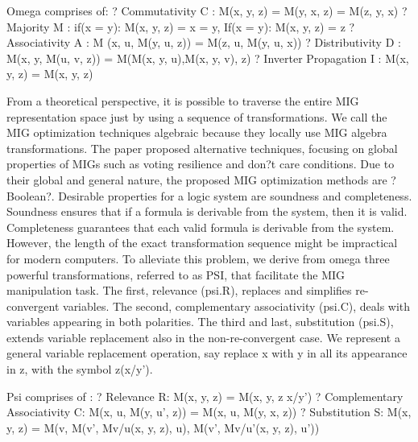 \documentclass[
	accentcolor=1c,%
	type=intern,
	marginpar=false,
	ruledheaders=section,
	class=report,
	BCOR=5mm,
      parskip=half-,
	fontsize=10pt
	]{tudapub}
\begin{document}
		Omega comprises of:\newline
		?	Commutativity C : M(x, y, z) = M(y, x, z) = M(z, y, x)\newline
		?	Majority M :  if(x = y): M(x, y, z) = x = y, If(x = y): M(x, y, z) = z\newline
		?	Associativity A : M (x, u, M(y, u, z)) = M(z, u, M(y, u, x))\newline
		?	Distributivity D : M(x, y, M(u, v, z)) = M(M(x, y, u),M(x, y, v), z)\newline
		?	Inverter Propagation I : M(x, y, z) = M(x, y, z)\newline
		\newline

		From a theoretical perspective, it is possible to traverse the entire MIG representation space just by using a sequence of transformations. We call the MIG optimization techniques algebraic because they locally use MIG algebra transformations. The paper proposed alternative techniques, focusing on global properties of MIGs such as voting resilience and don?t care conditions. Due to their global and general nature, the proposed MIG optimization methods are ?Boolean?. Desirable properties for a logic system are soundness and completeness. Soundness ensures that if a formula is derivable from the system, then it is valid. Completeness guarantees that each valid formula is derivable from the system. However, the length of the exact transformation sequence might be impractical for modern computers.\newline
		\newline
		To alleviate this problem, we derive from omega three powerful transformations, referred to as PSI, that facilitate the MIG manipulation task. The first, relevance (psi.R), replaces and simplifies re-convergent variables. The second, complementary associativity (psi.C), deals with variables appearing in both polarities. The third and last, substitution (psi.S), extends variable replacement also in the non-re-convergent case. We represent a general variable replacement operation, say replace x with y in all its appearance in z, with the symbol z(x/y').

		Psi comprises of :\newline
		?	Relevance R: M(x, y, z) = M(x, y, z x/y')\newline
		?	Complementary Associativity C: M(x, u, M(y, u', z)) = M(x, u, M(y, x, z))\newline
		?	Substitution S: M(x, y, z) = M(v, M(v', Mv/u(x, y, z), u), M(v', Mv/u'(x, y, z), u'))\newline
\end{document}
